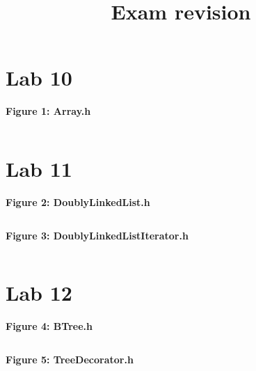 \documentclass[11pt, letterpaper]{article}
\title{Exam revision}
\author{}
\date{}
\newcommand{\includeminted}[3]
{
  \begin{center}
  \textbf{#1}
  \vspace{-5pt}
  \inputminted[linenos, breaklines]{#2}{#3}
  \end{center}
}
\begin{document}
\normalsize
\section{Lab 10}
\includeminted{Figure 1: Array.h}{cpp}{../10/src/Array.h}
\clearpage
\section{Lab 11}
\includeminted{Figure 2: DoublyLinkedList.h}{cpp}{../11/src/DoublyLinkedList.h}
\clearpage
\includeminted{Figure 3: DoublyLinkedListIterator.h}{cpp}{../11/src/DoublyLinkedListIterator.h}
\clearpage
\section{Lab 12}
\includeminted{Figure 4: BTree.h}{cpp}{../12/src/BTree.h}
\clearpage
\includeminted{Figure 5: TreeDecorator.h}{cpp}{../12/src/TreeDecorator.h}
\clearpage
\end{document}
